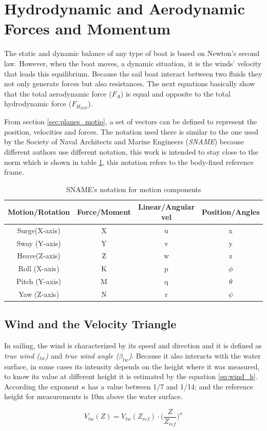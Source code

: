 \section{Hydrodynamic and Aerodynamic Forces and Momentum} \label{section:forces_moment}
The static and dynamic balance of any type of boat is based on Newton's second law. However, when the boat moves, a dynamic situation, it is the winds' velocity that leads this equilibrium. Because the sail boat interact between two fluids they not only  generate forces but also resistances.
The next equations basically show that the total aerodynamic force ($F_{A}$) is equal and opposite to the total hydrodynamic force ($F_{H_{TOT}}$). \par
From section \ref{sec:planes_motio}, a set of vectors can be defined to represent the position, velocities and forces. The notation used there is similar to the one used by the Society of Naval Architects and Marine Engineers (\textit{SNAME}) because different authors use different notation, this work is intended to stay close to the norm which is shown in table \ref{table:SNAME_notation}, this notation refers to the body-fixed reference frame.
\begin{table}%
    \centering
    \begin{tabular}{c|c|c|c}
    \hline
          Motion/Rotation & Force/Moment & Linear/Angular vel & Position/Angles   \\
    \hline 
         Surge(X-axis) & X & u & x \\  
         Sway (Y-axis) & Y & v & y \\
         Heave(Z-axis) & Z & w & z \\
         Roll (X-axis) & K & p & $\phi$ \\
         Pitch (Y-axis) & M & q & $\theta$\\
         Yaw (Z-axis) & N & r & $\psi$\\
    \end{tabular}
    \caption{SNAME’s notation for motion components \cite{Alves2014ASailboat}}
    \label{table:SNAME_notation}
\end{table}

\subsection{Wind and the Velocity Triangle} \label{sec:wind_vel_trian}
In sailing, the wind is characterized by its speed and direction and it is defined as \textit{true wind ($_{tw}$)} and \textit{true wind angle ($\beta_{tw}$)}.  Because it also interacts with the water surface, in some cases its intensity depends on the height where it was measured, to know its value at different height it is estimated by the equation \ref{eq:wind_h}. According \cite{claughton1998sailing} the exponent $\kappa$ has a value between 1/7 and 1/14; and the reference height for measurements is 10m above the water surface. \par 
\begin{equation}\label{eq:wind_h}
    V_{tw}(Z)=V_{tw}(Z_{ref}) \cdot \bigg( \frac{Z}{Z_{ref}} \bigg)^\kappa
\end{equation}

